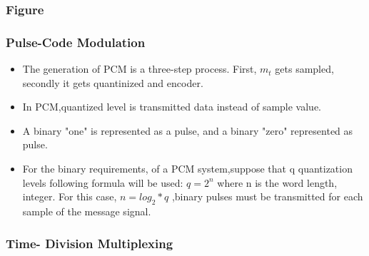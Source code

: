 \documentclass{beamer}
\begin{document}
         \begin{frame}
         \frametitle{Figure}
         \end{frame}
         
         \begin{frame}
         \frametitle{Pulse-Code Modulation}
         \begin{itemize}
         \item The generation of PCM is a three-step process. First, $m_t$ gets sampled, secondly it gets quantinized and encoder.
         \item In PCM,quantized level is transmitted data instead of sample value.
         \item A binary "one" is represented as a pulse, and a binary "zero" represented as pulse.
         \item For the binary requirements, of a PCM system,suppose that q 	quantization levels following formula  will be used: $q=2^n$ where n is the word length, integer. For this case, $n=log_2*q$ ,binary pulses must be transmitted for each sample of the message signal.
         \end {itemize}
         \end{frame}
         
         \begin{frame}
         \frametitle{Time- Division Multiplexing}
         \end{frame}
\end{document}
